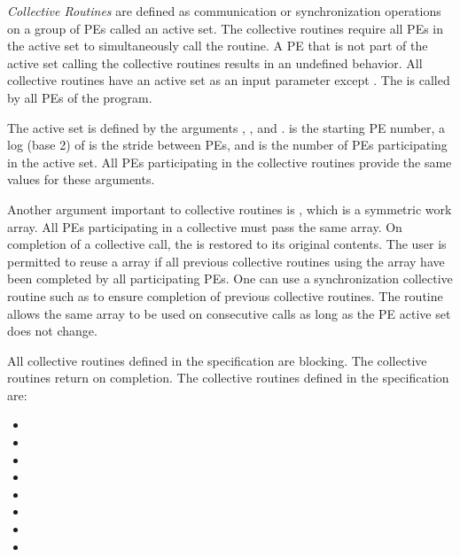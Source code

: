 \emph{Collective Routines} are defined as communication or synchronization operations on a 
group of \acp{PE} called an active set.  
The collective routines require all \acp{PE} in the active set to simultaneously call the
routine.  A \ac{PE} that is not part of the active set calling the collective
routines results in an undefined behavior.  All collective routines have an
active set as an input parameter except \barrierall. The \barrierall is
called by all \acp{PE} of the \openshmem program. 

The active set is defined by the arguments , ,
and .   is the starting \ac{PE} number, a log (base
2) of  is the stride between \acp{PE}, and  is
the number of \acp{PE} participating in the active set.  All \acp{PE}
participating in the collective routines provide the same values for these
arguments. 
 
Another argument important to collective routines is , which is a
symmetric work array.  All \acp{PE} participating in a collective must pass the
same  array.  On completion of a collective call, the  is
restored to its original contents.  The user is permitted to reuse a 
array if all previous collective routines using the  array have been
completed by all participating \acp{PE}.  One can use a synchronization
collective routine such as \barrier to ensure completion of previous collective
routines. The  routine allows the same  array to
be used on consecutive calls as long as the \ac{PE} active set does not change. 

All collective routines defined in the specification are blocking.  The
collective routines return on completion.  The collective routines defined in
the \openshmem specification are:

\begin{itemize}
\item[] \broadcast 
\item[] \barrier
\item[] \barrierall
\item[] \collect
\item[] \fcollect
\item[] \reduction
\item[] \alltoall
\item[] \alltoalls
{}
\end{itemize} 
